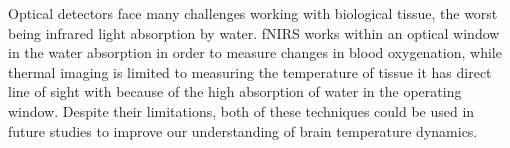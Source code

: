 Optical detectors face many challenges working with biological tissue, the worst being infrared light absorption by water. fNIRS works within an optical window in the water absorption in order to measure changes in blood oxygenation, while thermal imaging is limited to measuring the temperature of tissue it has direct line of sight with because of the high absorption of water in the operating window. Despite their limitations, both of these techniques could be used in future studies to improve our understanding of brain temperature dynamics.